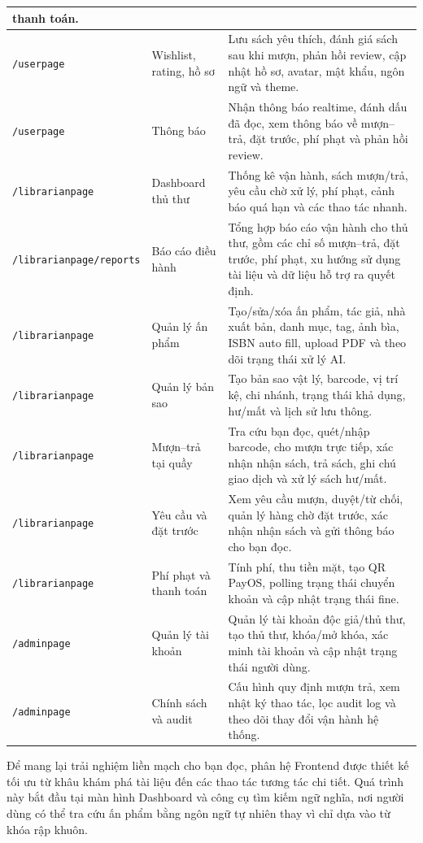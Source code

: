 \begin{longtable}{|p{3.3cm}|p{3.8cm}|p{7.2cm}|}
thanh toán. \\
\hline
\texttt{/userpage} & Wishlist, rating, hồ sơ &
Lưu sách yêu thích, đánh giá sách sau khi mượn, phản hồi review, cập nhật hồ sơ,
avatar, mật khẩu, ngôn ngữ và theme. \\
\hline
\texttt{/userpage} & Thông báo &
Nhận thông báo realtime, đánh dấu đã đọc, xem thông báo về mượn--trả, đặt trước,
phí phạt và phản hồi review. \\
\hline
\texttt{/librarianpage} & Dashboard thủ thư &
Thống kê vận hành, sách mượn/trả, yêu cầu chờ xử lý, phí phạt, cảnh báo quá hạn
và các thao tác nhanh. \\
\hline
{\footnotesize\texttt{/librarianpage/}\newline\texttt{reports}} & Báo cáo điều hành &
Tổng hợp báo cáo vận hành cho thủ thư, gồm các chỉ số mượn--trả, đặt trước, phí
phạt, xu hướng sử dụng tài liệu và dữ liệu hỗ trợ ra quyết định. \\
\hline
\texttt{/librarianpage} & Quản lý ấn phẩm &
Tạo/sửa/xóa ấn phẩm, tác giả, nhà xuất bản, danh mục, tag, ảnh bìa, ISBN auto
fill, upload PDF và theo dõi trạng thái xử lý AI. \\
\hline
\texttt{/librarianpage} & Quản lý bản sao &
Tạo bản sao vật lý, barcode, vị trí kệ, chi nhánh, trạng thái khả dụng, hư/mất
và lịch sử lưu thông. \\
\hline
\texttt{/librarianpage} & Mượn--trả tại quầy &
Tra cứu bạn đọc, quét/nhập barcode, cho mượn trực tiếp, xác nhận nhận sách, trả
sách, ghi chú giao dịch và xử lý sách hư/mất. \\
\hline
\texttt{/librarianpage} & Yêu cầu và đặt trước &
Xem yêu cầu mượn, duyệt/từ chối, quản lý hàng chờ đặt trước, xác nhận nhận sách
và gửi thông báo cho bạn đọc. \\
\hline
\texttt{/librarianpage} & Phí phạt và thanh toán &
Tính phí, thu tiền mặt, tạo QR PayOS, polling trạng thái chuyển khoản và cập
nhật trạng thái fine. \\
\hline
\texttt{/adminpage} & Quản lý tài khoản &
Quản lý tài khoản độc giả/thủ thư, tạo thủ thư, khóa/mở khóa, xác minh tài
khoản và cập nhật trạng thái người dùng. \\
\hline
\texttt{/adminpage} & Chính sách và audit &
Cấu hình quy định mượn trả, xem nhật ký thao tác, lọc audit log và theo dõi thay
đổi vận hành hệ thống. \\
\hline
\end{longtable}

Để mang lại trải nghiệm liền mạch cho bạn đọc, phân hệ Frontend được thiết kế tối ưu từ khâu khám phá tài liệu đến các thao tác tương tác chi tiết. Quá trình này bắt đầu tại màn hình Dashboard và công cụ tìm kiếm ngữ nghĩa, nơi người dùng có thể tra cứu ấn phẩm bằng ngôn ngữ tự nhiên thay vì chỉ dựa vào từ khóa rập khuôn.

